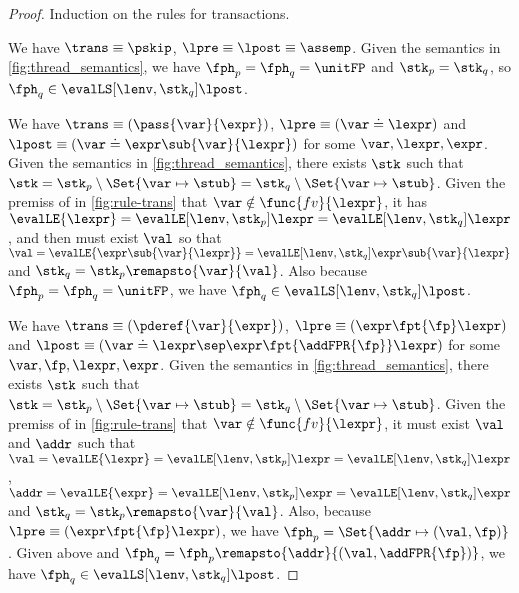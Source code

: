 \begin{proof}
Induction on the rules for transactions.


We have  \(\trans \equiv \pskip\), \( \lpre \equiv \lpost \equiv \assemp \).
Given the semantics in \fig \ref{fig:thread_semantics}, we have \( \fph_{p} = \fph_{q} = \unitFP \) and \( \stk_{p} = \stk_{q} \), so \( \fph_{q} \in \evalLS[\lenv, \stk_{q}]{\lpost} \).


We have \(\trans \equiv ( \pass{\var}{\expr} ) \), \( \lpre \equiv ( \var \doteq \lexpr ) \) and \( \lpost \equiv ( \var \doteq \expr\sub{\var}{\lexpr} ) \) for some \( \var, \lexpr, \expr \).
Given the semantics in \fig \ref{fig:thread_semantics}, there exists \( \stk \) such that \( \stk = \stk_{p} \setminus \Set{\var \mapsto \stub} = \stk_{q} \setminus \Set{\var \mapsto \stub} \).
Given the premiss of   in \fig \ref{fig:rule-trans} that \( \var \notin \func{fv}{\lexpr} \), it has \( \evalLE{\lexpr} = \evalLE[\lenv, \stk_{p}]{\lexpr} = \evalLE[\lenv, \stk_{q}]{\lexpr} \), and then must exist \( \val \) so that \( \val = \evalLE{\expr\sub{\var}{\lexpr}} = \evalLE[\lenv, \stk_{q}]{\expr\sub{\var}{\lexpr}} \) and \( \stk_{q} = \stk_{p}\remapsto{\var}{\val} \).
Also because \( \fph_{p} = \fph_{q} = \unitFP \), we have \( \fph_{q} \in \evalLS[\lenv, \stk_{q}]{\lpost} \).


We have  \(\trans \equiv ( \pderef{\var}{\expr} ) \), \( \lpre \equiv ( \expr \fpt{\fp} \lexpr ) \) and \( \lpost \equiv ( \var \doteq \lexpr \sep \expr \fpt{\addFPR{\fp}} \lexpr ) \) for some \( \var, \fp, \lexpr, \expr \).
Given the semantics in \fig \ref{fig:thread_semantics}, there exists \( \stk \) such that \( \stk = \stk_{p} \setminus \Set{\var \mapsto \stub} = \stk_{q} \setminus \Set{\var \mapsto \stub} \).
Given the premiss of  in \fig \ref{fig:rule-trans} that \( \var \notin \func{fv}{\lexpr} \), it must exist \( \val \) and \( \addr \) such that \( \val = \evalLE{\lexpr} = \evalLE[\lenv, \stk_{p}]{\lexpr} = \evalLE[\lenv, \stk_{q}]{\lexpr} \), \( \addr = \evalLE{\expr} = \evalLE[\lenv, \stk_{p}]{\expr} = \evalLE[\lenv, \stk_{q}]{\expr} \) and \(  \stk_{q} = \stk_{p}\remapsto{\var}{\val} \).
Also, because \( \lpre \equiv ( \expr \fpt{\fp} \lexpr ) \), we have \( \fph_{p} = \Set{\addr \mapsto (\val, \fp) }\).
Given above and \( \fph_{q} = \fph_{p}\remapsto{\addr}{ ( \val, \addFPR{\fp} ) } \), we have \( \fph_{q} \in \evalLS[\lenv, \stk_{q}]{\lpost} \).


\end{proof}
